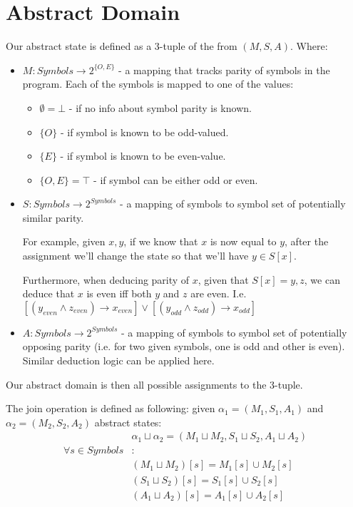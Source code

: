 \section*{Abstract Domain}
Our abstract state is defined as a 3-tuple of the from $(M,S,A)$. Where:

\begin{itemize}
	\item $M: Symbols \rightarrow 2^{\{O, E\}}$ - a mapping that tracks parity of symbols in the program. Each of the symbols is mapped to one of the values:
	\begin{itemize}
		\item $\emptyset=\bot$ - if no info about symbol parity is known.
		\item $\{O\}$ - if symbol is known to be odd-valued.
		\item $\{E\}$ - if symbol is known to be even-value.
		\item $\{O,E\}=\top$ - if symbol can be either odd or even.
	\end{itemize}
	\item $S: Symbols \rightarrow 2^{Symbols}$ - a mapping of symbols to symbol set of potentially similar parity.
	
	For example, given $x, y$, if we know that $x$ is now equal to $y$, after the assignment we'll change the state so that we'll have $y \in S[x]$.
	
	Furthermore, when  deducing parity of $x$, given that $S[x] = {y,z}$, we can deduce that $x$ is even iff both $y$ and $z$ are even.
	I.e. $[(y_{even} \wedge z_{even})\rightarrow x_{even}]\vee[(y_{odd} \wedge z_{odd})\rightarrow x_{odd}]$
	
	\item $A: Symbols \rightarrow 2^{Symbols}$ - a mapping of symbols to symbol set of potentially opposing parity (i.e. for two given symbols, one is odd and other is even). Similar deduction logic can be applied here.

\end{itemize}
Our abstract domain is then all possible assignments to the 3-tuple.
	
The join operation is defined as following: given $\alpha_1=(M_1,S_1,A_1)$ and $\alpha_2=(M_2,S_2,A_2)$ abstract states:
\begin{align*}
&\alpha_1\sqcup\alpha_2=(M_1\sqcup M_2, S_1 \sqcup S_2, A_1 \sqcup A_2) \\
\forall s \in Symbols&:  \\
&(M_1\sqcup M_2)[s] =M_1[s] \cup M_2[s] \\
&(S_1\sqcup S_2)[s] =S_1[s] \cup S_2[s] \\
&(A_1\sqcup A_2)[s] =A_1[s] \cup A_2[s]
\end{align*}